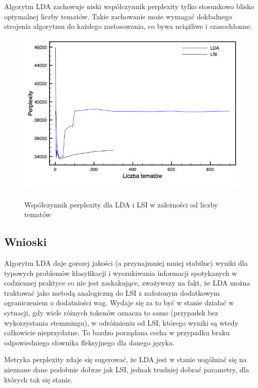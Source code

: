 \documentclass[11pt,a4paper]{article}
\begin{document}
Algorytm LDA zachowuje niski współczynnik perplexity tylko stosunkowo blisko
optymalnej liczby tematów. Takie zachowanie może wymagać dokładnego strojenia
algorytmu do każdego zastosowania, co bywa uciążliwe i czasochłonne.

\begin{figure}[h]
\caption{Współczynnik perplexity dla LDA i LSI w zależności od liczby tematów}
\includegraphics[width=\linewidth]{gfx/perplexity.png}
\label{fig:perplexity}
\end{figure}

\FloatBarrier

\subsection{Wnioski}

Algorytm LDA daje gorszej jakości (a przynajmniej mniej stabilne) wyniki dla
typowych problemów klasyfikacji i wyszukiwania informacji spotykanych w
codziennej praktyce co nie jest zaskakujące, zważywszy na fakt, że LDA można
traktować jako metodą analogiczną do LSI z nałożonym dodatkowym ograniczeniem o
dodatniości wag. Wydaje się za to być w stanie działać w sytuacji, gdy wiele
różnych tokenów oznacza to samo (przypadek bez wykorzystania stemmingu), w
odróżnieniu od LSI, którego wyniki są wtedy całkowicie nieprzydatne. To bardzo
porządana cecha w przypadku braku odpowiedniego słownika fleksyjnego dla danego
języka.

Metryka perplexity zdaje się sugerować, że LDA jest w stanie uogólniać się na
nieznane dane podobnie dobrze jak LSI, jednak trudniej dobrać parametry, dla
których tak się stanie.
\end{document}

